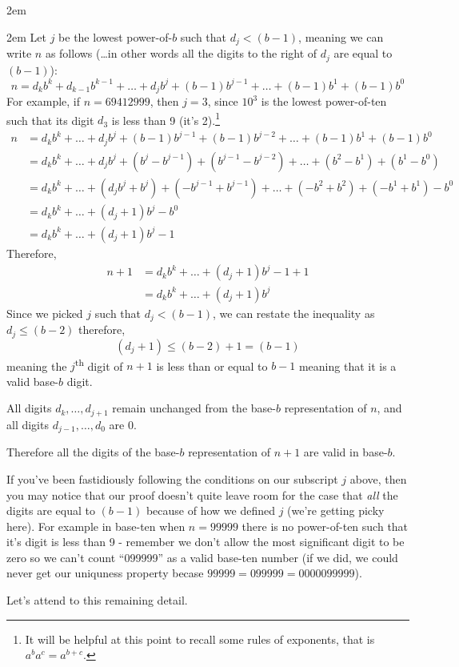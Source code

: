 \documentclass{article}
\newenvironment{jprIn}{\begin{adjustwidth}{2em}{}}{\end{adjustwidth}}
\begin{document}
\begin{jprIn}
\begin{jprIn}
Let $j$ be the lowest power-of-$b$ such that $d_j<(b-1)$,
meaning we can write $n$ as follows (\dots{}in other words all the digits to the right of $d_j$ are equal to $(b-1)$):
\[n = d_kb^k+d_{k-1}b^{k-1}+\dots+d_jb^j+(b-1)b^{j-1}+\dots+(b-1)b^1+(b-1)b^0\]
For example,
if $n=69412999$,
then $j=3$,
since $10^3$ is the lowest power-of-ten such that its digit $d_3$ is
less than 9 (it's 2).\footnote{It will
be helpful at this point to recall some rules of exponents, that is $a^ba^c=a^{b+c}$.}
\begin{align*}
n &=d_kb^k+\dots+d_jb^j+(b-1)b^{j-1}+(b-1)b^{j-2}+\dots+(b-1)b^1+(b-1)b^0\\
&= d_kb^k+\dots+d_jb^j+(b^j-b^{j-1})+(b^{j-1}-b^{j-2})+\dots+(b^2-b^1)+(b^1-b^0)\\
&= d_kb^k+\dots+(d_jb^j+b^j)+(-b^{j-1}+b^{j-1})+\dots+(-b^2+b^2)+(-b^1+b^1)-b^0\\
&= d_kb^k+\dots+(d_j+1)b^j-b^0\\
&= d_kb^k+\dots+(d_j+1)b^j-1
\end{align*}
Therefore,
\begin{align}
n+1 &=d_kb^k+\dots+(d_j+1)b^j-1+1 \nonumber \\
&= d_kb^k+\dots+(d_j+1)b^j \label{eqnA}
\end{align}
Since we picked $j$ such that $d_j<(b-1)$,
we can restate the inequality as\\
$d_j\le(b-2)$ therefore,
\[(d_j+1)\le(b-2)+1=(b-1)\]
meaning the $j$\textsuperscript{th} digit of $n+1$ is less than or equal to $b-1$ meaning that it is a valid base-$b$ digit.

All digits $d_k,\dots,{}d_{j+1}$ remain unchanged from the base-$b$ representation of $n$,
and all digits $d_{j-1},\dots{},d_0$ are 0.

Therefore all the digits of the base-$b$ representation of $n+1$ are valid in base-$b$.
\bigskip

If you've been fastidiously following the conditions on our subscript $j$ above, then
you may notice that
our proof doesn't quite leave room for the case
that \emph{all} the digits are equal to $(b-1)$ because of
how we defined $j$ (we're getting picky here).
For example in base-ten when $n=99999$ there is no power-of-ten such that
it's digit is less than 9 - remember we don't allow the most
significant digit to be zero so we can't count 
``099999'' as a valid base-ten number  (if we did, we
could never get our uniquness property becase $99999 = 099999 = 0000099999$).

Let's attend to this remaining detail.


\end{jprIn}
\end{jprIn}
\end{document}
